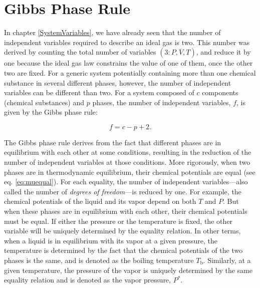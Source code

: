 \documentclass[
  9pt,
]{extbook}
\theoremstyle{definition}
\theoremstyle{definition}
\theoremstyle{definition}
\theoremstyle{remark}
\begin{document}
\hypertarget{gibbs-phase-rule}{%
\section{Gibbs Phase Rule}\label{gibbs-phase-rule}}

In chapter \ref{SystemVariables}, we have already seen that the number of independent variables required to describe an ideal gas is two. This number was derived by counting the total number of variables \((3: P,\overline{V},T)\), and reduce it by one because the ideal gas law constrains the value of one of them, once the other two are fixed. For a generic system potentially containing more than one chemical substance in several different phases, however, the number of independent variables can be different than two. For a system composed of \(c\) components (chemical substances) and \(p\) phases, the number of independent variables, \(f\), is given by the Gibbs phase rule:

\begin{equation}
f=c-p+2.
\label{eq:Gibbsrule}
\end{equation}

The Gibbs phase rule derives from the fact that different phases are in equilibrium with each other at some conditions, resulting in the reduction of the number of independent variables at those conditions. More rigorously, when two phases are in thermodynamic equilibrium, their chemical potentials are equal (see eq. \eqref{eq:muequal}). For each equality, the number of independent variables---also called the number of \emph{degrees of freedom}---is reduced by one. For example, the chemical potentials of the liquid and its vapor depend on both \(T\) and \(P\). But when these phases are in equilibrium with each other, their chemical potentials must be equal. If either the pressure or the temperature is fixed, the other variable will be uniquely determined by the equality relation. In other terms, when a liquid is in equilibrium with its vapor at a given pressure, the temperature is determined by the fact that the chemical potentials of the two phases is the same, and is denoted as the boiling temperature \(T_{\text{b}}\). Similarly, at a given temperature, the pressure of the vapor is uniquely determined by the same equality relation and is denoted as the vapor pressure, \(P^*\).
\end{document}
